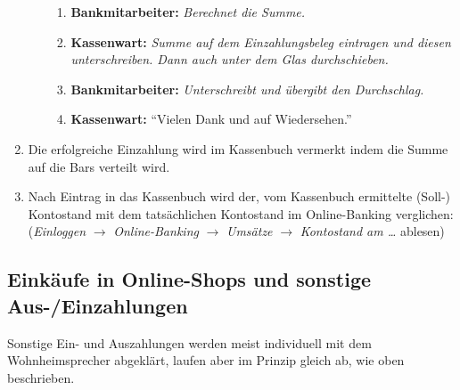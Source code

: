 \documentclass[10pt,a4paper,noendnumber=true]{scrartcl}
\begin{document}
\begin{enumerate}
\begin{enumerate}
\begin{enumerate}
			\item \textbf{Bankmitarbeiter:} \textit{Berechnet die Summe.}
			
			\item \textbf{Kassenwart:} \textit{Summe auf dem Einzahlungsbeleg eintragen und diesen unterschreiben. Dann auch unter dem Glas durchschieben.}
			
			\item \textbf{Bankmitarbeiter:} \textit{Unterschreibt und übergibt den Durchschlag.}
			
			\item \textbf{Kassenwart:} "`Vielen Dank und auf Wiedersehen."'
		\end{enumerate}
	\end{enumerate}	

	\item Die erfolgreiche Einzahlung wird im Kassenbuch vermerkt indem die Summe auf die Bars verteilt wird.
	
	\item Nach Eintrag in das Kassenbuch wird der, vom Kassenbuch ermittelte (Soll-) Kontostand mit dem tatsächlichen Kontostand im Online-Banking verglichen:\\(\textit{Einloggen} $\rightarrow$ \textit{Online-Banking} $\rightarrow$ \textit{Umsätze} $\rightarrow$ \textit{Kontostand am \ldots} ablesen)
\end{enumerate}

\subsection{Einkäufe in Online-Shops und sonstige Aus-/Einzahlungen}
Sonstige Ein- und Auszahlungen werden meist individuell mit dem Wohnheimsprecher abgeklärt, laufen aber im Prinzip gleich ab, wie oben beschrieben.
\end{document}
